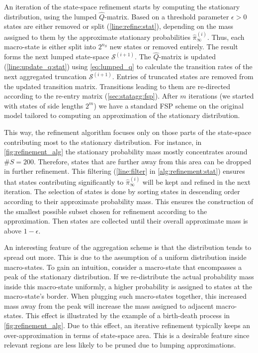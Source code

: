 An iteration of the state-space refinement starts by computing the stationary distribution, using the lumped $\hat Q$-matrix.
Based on a threshold parameter $\epsilon>0$
states are either removed or split (\autoref{line:refine:stat}), depending on
the mass assigned to them by the approximate stationary
probabilities $\hat\pi^{(i)}_{\infty}$.
Thus, each macro-state is either split into $2^{n_S}$ new states or removed
entirely.
The result forms the next lumped state-space $\mathcal{S}^{(i+1)}$.
The $\hat{Q}$-matrix is updated (\autoref{line:update_q:stat}) using \eqref{eq:lumped_q} to calculate the transition rates of the next aggregated truncation $\mathcal{S}^{(i+1)}$. 
Entries of truncated states are removed from the updated transition matrix.
Transitions leading to them are
re-directed according to the re-entry matrix (\autoref{sec:statagg:fsp}).
After $m$ iterations (we started with states of side lengths $2^m$)
we have a standard \ac{FSP} scheme
on the original model tailored to
computing an approximation of the stationary distribution.


This way, the refinement algorithm focuses only on those parts of the state-space contributing most to the stationary distribution.
For instance, in \autoref{fig:refinement_alg} the stationary probability mass mostly concentrates around $\#S=200$.
Therefore, states that are further away from this area can be dropped in further refinement.
This filtering (\autoref{line:filter} in \autoref{alg:refinement:stat}) ensures that
states contributing significantly to $\hat\pi_{\infty}^{(i)}$ will be kept and refined in the next iteration.
The selection of states is done by sorting states in descending order according to their approximate probability mass.
This ensures the construction of the smallest possible subset chosen for refinement according to the approximation.
Then states are collected until their overall approximate mass is above $1-\epsilon$.

An interesting feature of   the aggregation scheme is that the distribution
tends to spread out more.
This is due to the assumption of a uniform distribution inside macro-states.
To gain an intuition, consider a macro-state that encompasses a peak of the stationary distribution.
If we re-distribute the actual probability mass inside this macro-state uniformly,
a higher probability is assigned to states at the macro-state's border.
When plugging such macro-states together, this increased mass away from the peak will
increase the mass assigned to adjacent macro-states.
This effect is illustrated by the example of a birth-death process in \autoref{fig:refinement_alg}.
Due to this effect, an iterative refinement typically keeps an over-approximation in terms of state-space area.
This is a desirable feature since relevant regions are less likely to be pruned due to lumping approximations.

